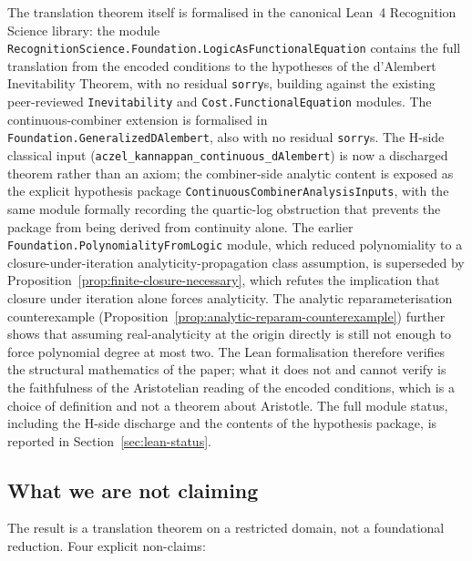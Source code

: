 \documentclass[11pt,a4paper]{article}
\theoremstyle{definition}
\theoremstyle{remark}
\begin{document}
The translation theorem itself is formalised in the canonical
Lean~4 Recognition Science library: the module
\texttt{RecognitionScience.Foundation.LogicAsFunctionalEquation}
contains the full translation from the encoded conditions to the
hypotheses of the d'Alembert Inevitability Theorem, with no residual
\texttt{sorry}s, building against the existing peer-reviewed
\texttt{Inevitability} and \texttt{Cost.FunctionalEquation} modules.
The continuous-combiner extension is formalised in
\texttt{Foundation.GeneralizedDAlembert}, also with no residual
\texttt{sorry}s. The H-side classical input
(\texttt{aczel\_kannappan\_continuous\_dAlembert}) is now a discharged
theorem rather than an axiom; the combiner-side analytic content is
exposed as the explicit hypothesis package
\texttt{ContinuousCombinerAnalysisInputs}, with the same module
formally recording the quartic-log obstruction that prevents the
package from being derived from continuity alone. The earlier
\texttt{Foundation.PolynomialityFromLogic} module, which reduced
polynomiality to a closure-under-iteration analyticity-propagation
class assumption, is superseded by
Proposition~\ref{prop:finite-closure-necessary}, which refutes the
implication that closure under iteration alone forces analyticity. The
analytic reparameterisation counterexample
(Proposition~\ref{prop:analytic-reparam-counterexample}) further shows
that assuming real-analyticity at the origin directly is still not
enough to force polynomial degree at most two. The Lean formalisation
therefore verifies the structural mathematics of the paper; what it
does not and cannot verify is the faithfulness of the Aristotelian
reading of the encoded conditions, which is a choice of definition and
not a theorem about Aristotle. The full module status, including the
H-side discharge and the contents of the hypothesis package, is
reported in Section~\ref{sec:lean-status}.

\subsection{What we are not claiming}\label{subsec:not-claimed}

The result is a translation theorem on a restricted domain, not a
foundational reduction. Four explicit non-claims:
\end{document}
